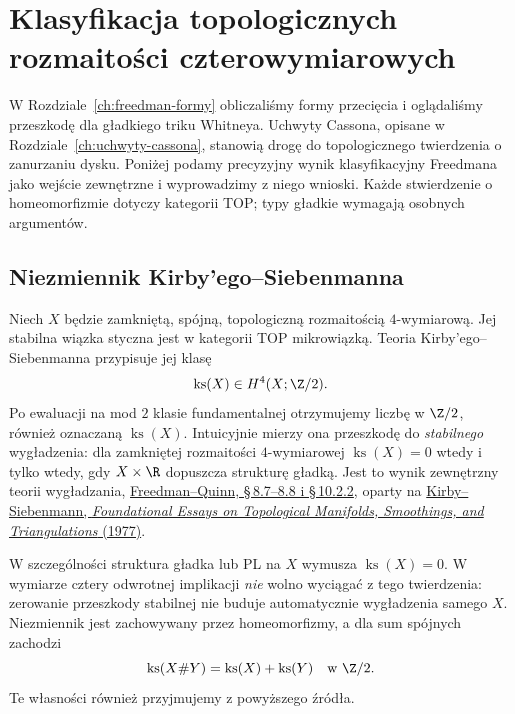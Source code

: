 \chapter{Klasyfikacja topologicznych rozmaitości czterowymiarowych}
\label{ch:freedman-klasyfikacja}

W Rozdziale~\ref{ch:freedman-formy} obliczaliśmy formy
przecięcia i oglądaliśmy przeszkodę dla gładkiego
triku Whitneya. Uchwyty Cassona, opisane w
Rozdziale~\ref{ch:uchwyty-cassona}, stanowią drogę
do topologicznego twierdzenia o zanurzaniu dysku.
Poniżej podamy precyzyjny wynik klasyfikacyjny
Freedmana jako wejście zewnętrzne i wyprowadzimy
z niego wnioski. Każde stwierdzenie o homeomorfizmie
dotyczy kategorii TOP; typy gładkie wymagają
osobnych argumentów.

\section{Niezmiennik Kirby'ego--Siebenmanna}
\label{sec:freedman-ks}

Niech $X$ będzie zamkniętą, spójną, topologiczną
rozmaitością $4$-wymiarową. Jej stabilna wiązka
styczna jest w kategorii TOP mikrowiązką. Teoria
Kirby'ego--Siebenmanna przypisuje jej klasę
\begin{equation}\label{eq:freedman-ks}
 \operatorname{ks}(X)\in H^4(X;\Z/2).
\end{equation}
Po ewaluacji na mod $2$ klasie fundamentalnej
otrzymujemy liczbę w $\Z/2$, również oznaczaną
$\operatorname{ks}(X)$. Intuicyjnie mierzy ona
przeszkodę do \emph{stabilnego} wygładzenia: dla
zamkniętej rozmaitości $4$-wymiarowej
$\operatorname{ks}(X)=0$ wtedy i tylko wtedy,
gdy $X\times\R$ dopuszcza strukturę gładką.
Jest to wynik zewnętrzny teorii wygładzania,
\href{https://archive.mpim-bonn.mpg.de/4789/2/FreedmanQuinn-TopologyOf4Manifolds-Reformatted2013.pdf}
{Freedman--Quinn, \S\,8.7--8.8 i \S\,10.2.2},
oparty na
\href{https://doi.org/10.1515/9781400881505}
{Kirby--Siebenmann, \emph{Foundational Essays on
Topological Manifolds, Smoothings, and Triangulations}
(1977)}.

W szczególności struktura gładka lub PL na $X$
wymusza $\operatorname{ks}(X)=0$. W wymiarze cztery
odwrotnej implikacji \emph{nie} wolno wyciągać z
tego twierdzenia: zerowanie przeszkody stabilnej
nie buduje automatycznie wygładzenia samego $X$.
Niezmiennik jest zachowywany przez homeomorfizmy,
a dla sum spójnych zachodzi
\[
 \operatorname{ks}(X\#Y)
   =\operatorname{ks}(X)+\operatorname{ks}(Y)
       \quad\text{w }\Z/2.
\]
Te własności również przyjmujemy z powyższego źródła.

